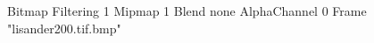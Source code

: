 {Bitmap
	{Filtering 1}
	{Mipmap 1}
	{Blend none}
	{AlphaChannel 0}
	{Frame "lisander200.tif.bmp"}
}
